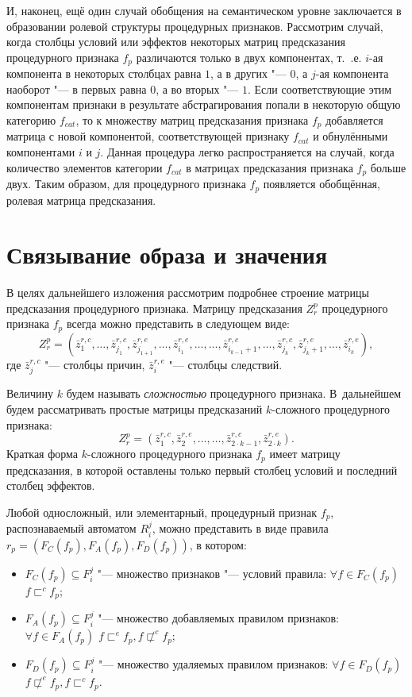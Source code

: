 \documentclass[a4paper, 12pt]{article}
\theoremstyle{plain}
\begin{document}
	И, наконец, ещё один случай обобщения на семантическом уровне заключается в образовании ролевой структуры процедурных признаков. Рассмотрим случай, когда столбцы условий или эффектов некоторых матриц предсказания процедурного признака $f_p$ различаются только в двух компонентах, т.~.е. $i$-ая компонента в некоторых столбцах равна $1$, а в других "--- $0$, а $j$-ая компонента наоборот "--- в первых равна $0$, а во вторых "--- $1$. Если соответствующие этим компонентам признаки в результате абстрагирования попали в некоторую общую категорию $f_{cat}$, то к множеству матриц предсказания признака $f_p$ добавляется матрица с новой компонентой, соответствующей признаку $f_{cat}$ и обнулёнными компонентами $i$ и $j$. Данная процедура легко распространяется на случай, когда количество элементов категории $f_{cat}$ в матрицах предсказания признака $f_p$ больше двух. Таким образом, для процедурного признака $f_p$ появляется обобщённая, ролевая матрица предсказания.

	\section{Связывание образа и значения}
	В целях дальнейшего изложения рассмотрим подробнее строение матрицы предсказания процедурного признака. Матрицу предсказания $Z_r^p$ процедурного признака $f_p$ всегда можно представить в следующем виде:
	\begin{equation}
	Z_r^p=(\bar z_1^{r,c},\dots,\bar z_{j_1}^{r,c},\bar z_{j_{1+1}}^{r,e},\dots,\bar z_{i_1}^{r,e},\dots,\dots,\bar z_{i_{k-1}+1}^{r,c},\dots,\bar z_{j_k}^{r,c},\bar z_{j_k+1}^{r,e},\dots,\bar z_{i_k}^{r,e}),
	\end{equation}
	где $\bar z_j^{r,c}$ "--- столбцы причин, $\bar z_i^{r,e}$ "--- столбцы следствий. 
	
	Величину $k$ будем называть \textit{сложностью} процедурного признака. В~дальнейшем будем рассматривать простые матрицы предсказаний $k$-сложного процедурного признака:
	\begin{equation}
	Z_r^p=(\bar z_1^{r,c},\bar z_2^{r,e},\dots,\dots,\bar z_{2\cdot k-1}^{r,c},\bar z_{2\cdot k}^{r,e}).
	\end{equation}
	Краткая форма $k$-сложного процедурного признака $f_p$ имеет матрицу предсказания, в которой оставлены только первый столбец условий и последний столбец эффектов.
	
	Любой односложный, или элементарный, процедурный признак $f_p$, распознаваемый автоматом $R_i^j$, можно представить в виде правила $r_p=(F_C(f_p),F_A(f_p),F_D(f_p))$, в котором:
	\begin{itemize}
		\item $F_C (f_p )\subseteq F_i^j$ "--- множество признаков "--- условий правила: $\forall f\in F_C(f_p)$ $f\sqsubset^c f_p$;
		\item $F_A(f_p)\subseteq F_i^j$ "--- множество добавляемых правилом признаков: $\forall f\in F_A(f_p)$ $f\sqsubset^e f_p,f\not\sqsubset^c f_p$;
		\item $F_D(f_p)\subseteq F_i^j$ "--- множество удаляемых правилом признаков: $\forall f\in F_D(f_p)$ $f\not\sqsubset^e f_p,f\sqsubset^c f_p$.
	\end{itemize}
	
\end{document}
